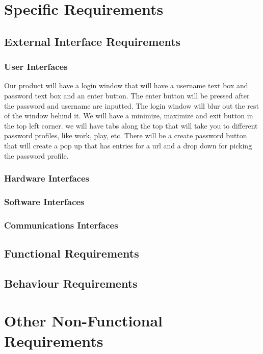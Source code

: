 \documentclass[12pt]{report}
\begin{document}

\chapter{Specific Requirements}

\section{External Interface Requirements}

\subsection{User Interfaces}
Our product will have a login window that will have a username text box and password
text box and an enter button. The enter button will be pressed after the password 
and username are inputted. The login window will blur out the rest of the window
behind it.
We will have a minimize, maximize  and exit button in the top left corner. 
we will have tabs along the top that will take you to different password profiles,
like work, play, etc. 
There will be a create password button that will create a pop up that has entries
for a url and a drop down for picking the password profile. 
\subsection{Hardware Interfaces}

\subsection{Software Interfaces}

\subsection{Communications Interfaces}

\section{Functional Requirements}

\section{Behaviour Requirements}




\chapter{Other Non-Functional Requirements}
\end{document}
